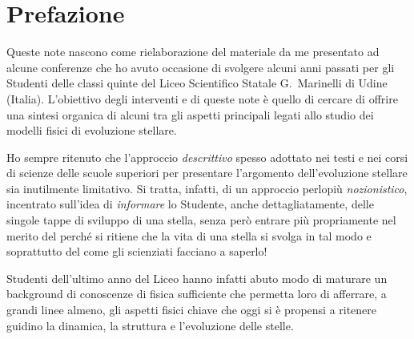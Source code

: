 
\chapter*{Prefazione}

Queste note nascono come rielaborazione del materiale da me presentato ad alcune
conferenze che ho avuto occasione di svolgere alcuni anni passati per gli
Studenti delle classi quinte del Liceo Scientifico Statale G.~Marinelli di Udine
(Italia).  L'obiettivo degli interventi e di queste note \`e quello di cercare
di offrire una sintesi organica di alcuni tra gli aspetti principali legati allo
studio dei modelli fisici di evoluzione stellare.

Ho sempre ritenuto che l'approccio \emph{descrittivo} spesso adottato nei testi
e nei corsi di scienze delle scuole superiori per presentare l'argomento
dell'evoluzione stellare sia inutilmente limitativo.  Si tratta, infatti, di un
approccio perlopi\`u \emph{nozionistico},  incentrato sull'idea di
\emph{informare} lo Studente, anche dettagliatamente, delle singole tappe di
sviluppo di una stella, senza per\`o entrare pi\`u propriamente nel merito del
perch\'e si ritiene che la vita di una stella si svolga in tal modo e
soprattutto del come gli scienziati facciano a saperlo!

Studenti  dell'ultimo anno del Liceo hanno infatti abuto modo di maturare un
background di conoscenze di fisica sufficiente che permetta loro di afferrare, a
grandi linee almeno, gli aspetti fisici chiave che oggi si \`e propensi a
ritenere guidino la dinamica, la struttura e l'evoluzione delle stelle.

